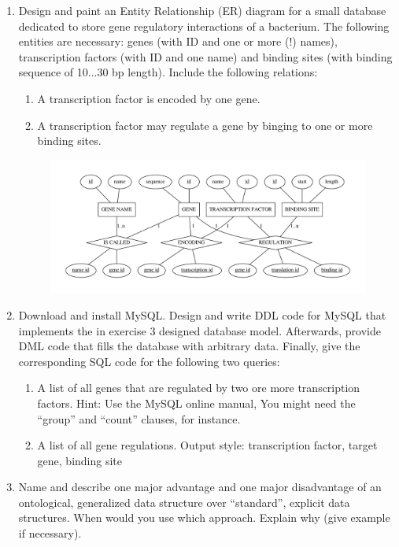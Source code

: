 \documentclass[a4paper,10pt,titlepage]{article}
\begin{document}
\begin{enumerate}
\item
Design and paint an Entity Relationship (ER) diagram for a small database dedicated to store gene regulatory interactions of a bacterium. The following entities are necessary: genes (with ID and one or more (!) names), transcription factors (with ID and one name) and binding sites (with binding sequence of 10...30 bp length). Include the following relations: 
\begin{enumerate}
\item 
A transcription factor is encoded by one gene. 
\item 
A transcription factor may regulate a gene by binging to one or more binding sites.
\end{enumerate}
\begin{figure}
\centering
\includegraphics[scale=0.4]{graph.pdf}

\end{figure}
\item
Download and install MySQL. Design and write DDL code for MySQL that implements the in exercise 3 designed database model. Afterwards, provide DML code that fills the database with arbitrary data. Finally, give the corresponding 
SQL code for the following two queries:
\begin{enumerate}
\item
A list of all genes that are regulated by two ore more transcription factors. Hint: Use the MySQL online manual, You might need the “group” and “count” clauses, for instance.
\item
A list of all gene regulations. Output style: transcription factor, target gene, binding site
\end{enumerate}

\item
Name and describe one major advantage and one major disadvantage of an ontological, generalized data structure over 
“standard”, explicit data structures. When would you use which approach. Explain why (give example if necessary).
\end{enumerate}
\end{document}
